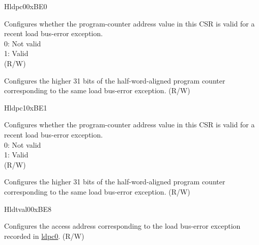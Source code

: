 \begin{register}{H}{ldpc0}{0xBE0}\label{regdesc:LDPC0}%
%
%
\regnewline%
\begin{regdesc}\begin{reglist}
\label{fielddesc:LDPC0_VLD}\item [VLD] Configures whether the program-counter address value in this CSR is valid for a recent load bus-error exception.\\
0: Not valid\\
1: Valid\\
(R/W)
\label{fielddesc:LDPC0_ADDR}\item [ADDR] Configures the higher 31 bits of the half-word-aligned program counter corresponding to the same load bus-error exception. (R/W)
\end{reglist}\end{regdesc}
\end{register}

\begin{register}{H}{ldpc1}{0xBE1}\label{regdesc:LDPC1}%
%
%
\regnewline%
\begin{regdesc}\begin{reglist}
\label{fielddesc:LDPC1_VLD}\item [VLD] Configures whether the program-counter address value in this CSR is valid for a recent load bus-error exception.\\
0: Not valid\\
1: Valid\\
(R/W)
\label{fielddesc:LDPC1_ADDR}\item [ADDR] Configures the higher 31 bits of the half-word-aligned program counter corresponding to the same load bus-error exception. (R/W)
\end{reglist}\end{regdesc}
\end{register}

\begin{register}{H}{ldtval0}{0xBE8}\label{regdesc:LDTVAL0}%
%
\regnewline%
\begin{regdesc}\begin{reglist}
\label{fielddesc:LDTVAL0_ADDR}\item [ADDR] Configures the access address corresponding to the load bus-error exception recorded in \hyperref[regdesc:LDPC0]{ldpc0}. (R/W)
\end{reglist}\end{regdesc}
\end{register}

